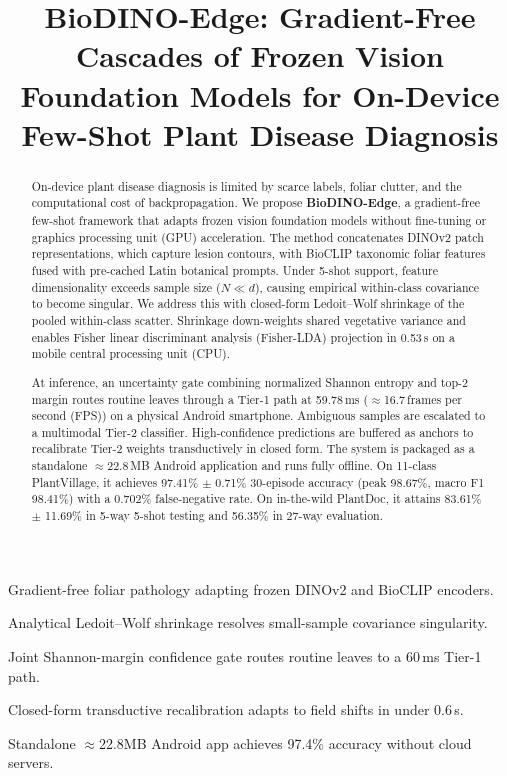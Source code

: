 \documentclass[preprint,12pt]{elsarticle}
\begin{document}
\begin{frontmatter}

\title{BioDINO-Edge: Gradient-Free Cascades of Frozen Vision Foundation Models for On-Device Few-Shot Plant Disease Diagnosis}

\begin{abstract}
On-device plant disease diagnosis is limited by scarce labels, foliar clutter, and the computational cost of backpropagation. We propose \textbf{BioDINO-Edge}, a gradient-free few-shot framework that adapts frozen vision foundation models without fine-tuning or graphics processing unit (GPU) acceleration. The method concatenates DINOv2 patch representations, which capture lesion contours, with BioCLIP taxonomic foliar features fused with pre-cached Latin botanical prompts. Under 5-shot support, feature dimensionality exceeds sample size ($N \ll d$), causing empirical within-class covariance to become singular. We address this with closed-form Ledoit--Wolf shrinkage of the pooled within-class scatter. Shrinkage down-weights shared vegetative variance and enables Fisher linear discriminant analysis (Fisher-LDA) projection in 0.53\,s on a mobile central processing unit (CPU).

At inference, an uncertainty gate combining normalized Shannon entropy and top-2 margin routes routine leaves through a Tier-1 path at 59.78\,ms ($\approx$16.7\,frames per second (FPS)) on a physical Android smartphone. Ambiguous samples are escalated to a multimodal Tier-2 classifier. High-confidence predictions are buffered as anchors to recalibrate Tier-2 weights transductively in closed form. The system is packaged as a standalone $\approx$22.8\,MB Android application and runs fully offline. On 11-class PlantVillage, it achieves 97.41\% $\pm$ 0.71\% 30-episode accuracy (peak 98.67\%, macro F1 98.41\%) with a 0.702\% false-negative rate. On in-the-wild PlantDoc, it attains 83.61\% $\pm$ 11.69\% in 5-way 5-shot testing and 56.35\% in 27-way evaluation.
\end{abstract}

\begin{highlights}
\item Gradient-free foliar pathology adapting frozen DINOv2 and BioCLIP encoders.
\item Analytical Ledoit--Wolf shrinkage resolves small-sample covariance singularity.
\item Joint Shannon-margin confidence gate routes routine leaves to a 60\,ms Tier-1 path.
\item Closed-form transductive recalibration adapts to field shifts in under 0.6\,s.
\item Standalone $\approx$22.8MB Android app achieves 97.4\% accuracy without cloud servers.
\end{highlights}


\end{frontmatter}
\end{document}
